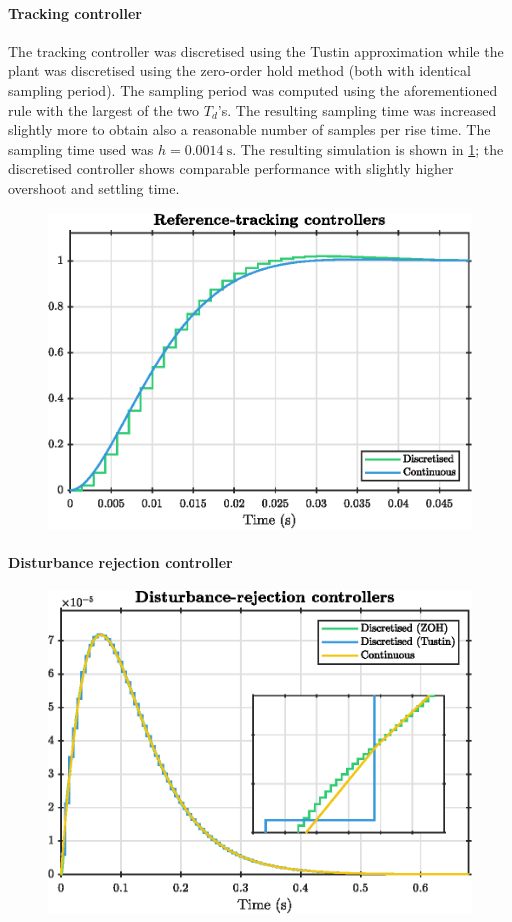 \paragraph{Tracking controller}
The tracking controller was discretised using the Tustin approximation while the plant was discretised using the zero-order hold method (both with identical sampling period). The sampling period was computed using the aforementioned rule with the largest of the two $T_d$'s. The resulting sampling time was increased slightly more to obtain also a reasonable number of samples per rise time. The sampling time used was $h = \SI{0.0014}{\second}$. The resulting simulation is shown in \cref{fig:q4_dt_tracking}; the discretised controller shows comparable performance with slightly higher overshoot and settling time.
\begin{figure}[ht]
    \centering
    \includegraphics[]{media/q4/dt_tracking.eps}
    \caption{}
    \label{fig:q4_dt_tracking}
\end{figure}

\paragraph{Disturbance rejection controller}
\begin{figure}[ht]
    \centering
    \includegraphics[]{media/q4/dt_distrej.eps}
    \caption{}
    \label{fig:q4_dt_distrej}
\end{figure}